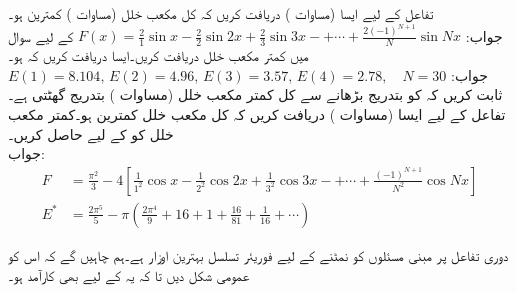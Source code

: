 \quad تفاعل  کے لیے ایسا  (مساوات ) دریافت کریں کہ کل مکعب خلل (مساوات ) کمترین ہو۔ \\
جواب:\quad
$F(x)=\tfrac{2}{1}\sin x-\tfrac{2}{2}\sin 2x+\tfrac{2}{3}\sin 3x-+\cdots +\tfrac{2(-1)^{N+1}}{N}\sin Nx$
\quad {} کے لیے سوال  میں کمتر مکعب خلل دریافت کریں۔ایسا  دریافت کریں کہ  ہو۔\\
جواب:\quad
$E(1)=8.104,\,E(2)=4.96,\,E(3)=3.57,\,E(4)=2.78,\quad N=30$
\quad ثابت کریں کہ  کو بتدریج بڑھانے سے کل کمتر مکعب خلل  (مساوات ) بتدریج گھٹتی ہے۔ 
\quad  تفاعل  کے لیے ایسا  (مساوات ) دریافت کریں کہ کل مکعب خلل کمترین ہو۔کمتر مکعب خلل کو  کے لیے حاصل کریں۔\\
جواب:
\begin{align*}
F&=\tfrac{\pi^2}{3}-4[\tfrac{1}{1^2}\cos x-\tfrac{1}{2^2}\cos 2x+\tfrac{1}{3^2}\cos 3x-+\cdots +\tfrac{(-1)^{N+1}}{N^2}\cos Nx]\\
E^* &=\tfrac{2\pi^5}{5}-\pi(\tfrac{2\pi^4}{9}+16+1+\tfrac{16}{81}+\tfrac{1}{16}+\cdots)
\end{align*}

دوری تفاعل پر مبنی مسئلوں کو نمٹنے کے لیے فوریئر تسلسل بہترین اوزار ہے۔ہم چاہیں گے کہ اس  کو عمومی شکل دیں تا کہ یہ  کے لیے بھی کارآمد ہو۔ 

